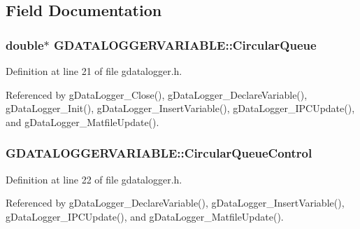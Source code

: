 \subsection{Field Documentation}
\hypertarget{structGDATALOGGERVARIABLE_ae17ad02442f31da9518c99ce13607c8b}{
\subsubsection[{Circular\-Queue}]{\setlength{\rightskip}{0pt plus 5cm}double$\ast$ G\-D\-A\-T\-A\-L\-O\-G\-G\-E\-R\-V\-A\-R\-I\-A\-B\-L\-E\-::\-Circular\-Queue}}\label{structGDATALOGGERVARIABLE_ae17ad02442f31da9518c99ce13607c8b}


Definition at line 21 of file gdatalogger.\-h.



Referenced by g\-Data\-Logger\-\_\-\-Close(), g\-Data\-Logger\-\_\-\-Declare\-Variable(), g\-Data\-Logger\-\_\-\-Init(), g\-Data\-Logger\-\_\-\-Insert\-Variable(), g\-Data\-Logger\-\_\-\-I\-P\-C\-Update(), and g\-Data\-Logger\-\_\-\-Matfile\-Update().

\hypertarget{structGDATALOGGERVARIABLE_a1a50747d2223f228288b4656470d9bbc}{
\subsubsection[{Circular\-Queue\-Control}]{ G\-D\-A\-T\-A\-L\-O\-G\-G\-E\-R\-V\-A\-R\-I\-A\-B\-L\-E\-::\-Circular\-Queue\-Control}}\label{structGDATALOGGERVARIABLE_a1a50747d2223f228288b4656470d9bbc}


Definition at line 22 of file gdatalogger.\-h.



Referenced by g\-Data\-Logger\-\_\-\-Declare\-Variable(), g\-Data\-Logger\-\_\-\-Insert\-Variable(), g\-Data\-Logger\-\_\-\-I\-P\-C\-Update(), and g\-Data\-Logger\-\_\-\-Matfile\-Update().

